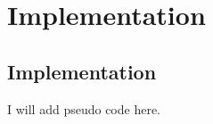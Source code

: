 \chapter{Implementation}
\label{implementation}

\section{Implementation}

I will add pseudo code here.


